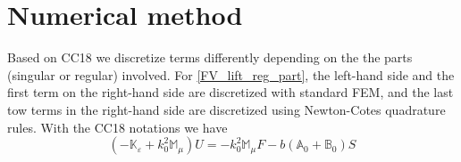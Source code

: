 \documentclass[11pt]{article}
\theoremstyle{plain}
\begin{document}
\section{Numerical method}
Based on CC18 we discretize terms differently depending on the the parts (singular or regular) involved. For \eqref{FV_lift_reg_part}, the left-hand side and the first term on the right-hand side are discretized with standard FEM, and the last tow terms in the right-hand side are discretized using Newton-Cotes quadrature rules. With the CC18 notations we have
\[ \left(- \mathbb{K}_\varepsilon + k^2_0 \mathbb{M}_\mu \right) U =  - k^2_0 \mathbb{M}_\mu F - b (\mathbb{A}_0 + \mathbb{B}_0)S \]

\end{document}
